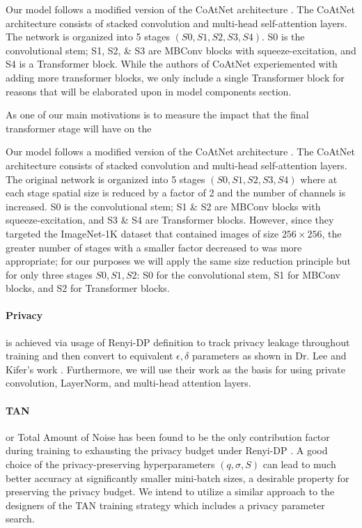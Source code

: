 Our model follows a modified version of the CoAtNet architecture \cite{b9}. The CoAtNet architecture
consists of stacked convolution and multi-head self-attention layers. The network is organized into 5
stages \((S0, S1, S2, S3, S4)\). S0 is the convolutional stem; S1, S2, \& S3 are MBConv blocks with
squeeze-excitation, and S4 is a Transformer block. While the authors of CoAtNet experiemented with adding
more transformer blocks, we only include a single Transformer block for reasons that will be elaborated
upon in model components section.

As one of our main motivations is to measure the impact that the final transformer stage will have on
the

Our model follows a modified version of the CoAtNet architecture \cite{b9}. The CoAtNet architecture
consists of stacked convolution and multi-head self-attention layers. The original network is organized into 5
stages \((S0, S1, S2, S3, S4)\) where at each stage spatial size is reduced by a factor of 2 and the number of channels is increased.
S0 is the convolutional stem; S1 \& S2 are MBConv blocks with
squeeze-excitation, and S3 \& S4 are Transformer blocks. However, since they targeted the ImageNet-1K
dataset that contained images of size \(256 \times 256\), the greater number of stages with a smaller factor
decreased to was more appropriate; for our purposes we will apply the same size reduction principle
but for only three stages \(S0, S1, S2\): S0 for the convolutional stem, S1 for MBConv blocks, and S2 for
Transformer blocks.

\paragraph{Privacy} is achieved via usage of Renyi-DP definition
to track privacy leakage throughout training and then convert to
equivalent \(\epsilon, \delta\) parameters as shown in Dr. Lee and Kifer's work \cite{b3}. Furthermore,
we will use their work as the basis for using private convolution, LayerNorm, and multi-head attention layers.

\paragraph{TAN} or Total Amount of Noise has been found to be the only contribution factor during
training to exhausting the privacy budget under Renyi-DP \cite{b7}. A good choice of the
privacy-preserving hyperparameters
\((q, \sigma, S)\) can lead to much better accuracy at significantly smaller mini-batch sizes, a desirable
property for preserving the privacy budget. We intend to utilize a similar approach to the designers
of the TAN training strategy which includes a privacy parameter search.

